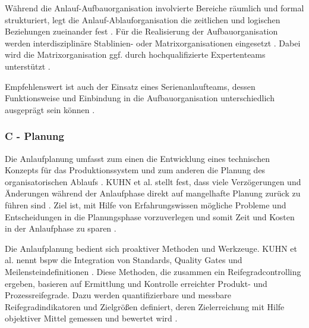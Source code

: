 Während die Anlauf-Aufbauorganisation involvierte Bereiche räumlich und formal strukturiert, legt die Anlauf-Ablauforganisation die zeitlichen und logischen Beziehungen zueinander fest \autocite[55]{Schuh2008}.
Für die Realisierung der Aufbauorganisation werden interdisziplinäre Stablinien- oder Matrixorganisationen eingesetzt \autocite[77]{Bischoff2007}. Dabei wird die Matrixorganisation ggf. durch hochqualifizierte Expertenteams unterstützt \autocite[407]{Schuh2005}. %

Empfehlenswert ist auch der Einsatz eines Serienanlaufteams, dessen Funktionsweise und Einbindung in die Aufbauorganisation unterschiedlich ausgeprägt sein können \autocite[79]{Bischoff2007}. 

\subsubsection*{C - Planung}

Die Anlaufplanung umfasst zum einen die Entwicklung eines technischen Konzepts für das Produktionssystem und zum anderen die Planung des organisatorischen Ablaufs \autocite[149]{Risse2002}. %
KUHN et al. stellt fest, dass viele Verzögerungen und Änderungen während der Anlaufphase direkt auf mangelhafte Planung zurück zu führen sind \autocite[19]{Kuhn2002}. 
Ziel ist, mit Hilfe von Erfahrungswissen mögliche Probleme und Entscheidungen in die Planungsphase vorzuverlegen und somit Zeit und Kosten in der Anlaufphase zu sparen \autocite[149]{Risse2002}.  %

Die Anlaufplanung bedient sich proaktiver Methoden und Werkzeuge. KUHN et al. nennt \gls{bspw} die Integration von Standards, Quality Gates und Meilensteindefinitionen \autocite[19]{Kuhn2002}. 
Diese Methoden, die zusammen ein Reifegradcontrolling ergeben, basieren auf Ermittlung und Kontrolle erreichter Produkt- und Prozessreifegrade. Dazu werden quantifizierbare und messbare Reifegradindikatoren und Zielgrößen definiert, deren Zielerreichung mit Hilfe objektiver Mittel gemessen und bewertet wird \autocite[62--63]{Schuh2008}. 

